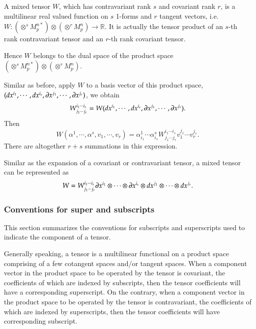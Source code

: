 \documentclass[11pt, a4paper]{book}
\begin{document}
\begin{Definition}
  A mixed tensor $W$, which has contravariant rank $s$ and covariant rank $r$, is a
  multilinear real valued function on $s$ 1-forms and $r$ tangent vectors, i.e.
  $W:\left( \otimes^s M_p^{n*} \right) \otimes \left( \otimes^r M_p^n \right) \rightarrow
  \mathbb{R}$. It is actually the tensor product of an $s$-th rank contravariant tensor and
  an $r$-th rank covariant tensor.
\end{Definition}
Hence $W$ belongs to the dual space of the product space
$\left( \otimes^s M_p^{n*} \right) \otimes \left( \otimes^r M_p^n \right)$.

Similar as before, apply $W$ to a basis vector of this product space,
$(dx^{i_1},\cdots,dx^{i_s},\boldsymbol{\partial}x^{j_1},\cdots,\boldsymbol{\partial}x^{j_r})$, we obtain
\begin{equation}
  W^{i_1\cdots i_s}_{j_1\cdots j_r} = W(dx^{i_1},\cdots,dx^{i_s},\boldsymbol{\partial}x^{j_1},\cdots,\boldsymbol{\partial}x^{j_r}).
\end{equation}
Then
\begin{equation}
  W(\alpha^1,\cdots,\alpha^s,v_1,\cdots,v_r) = \alpha_{i_1}^1\cdots \alpha_{i_s}^s
  W^{i_1\cdots i_s}_{j_1\cdots j_r} v_1^{j_1}\cdots v_r^{j_r}.
\end{equation}
There are altogether $r+s$ summations in this expression.

Similar as the expansion of a covariant or contravariant tensor, a mixed tensor can be
represented as
\begin{equation}
  \label{eq:mixed-tensor-expanded-as-tensor-product}
  W = W^{i_1\cdots i_s}_{j_1\cdots j_r} \boldsymbol{\partial}x^{i_1}\otimes\cdots\otimes
  \boldsymbol{\partial}x^{i_s}\otimes dx^{j_1}\otimes\cdots\otimes dx^{j_r}.
\end{equation}

\subsubsection{Conventions for super and subscripts}

This section summarizes the conventions for subscripts and superscripts used to indicate
the component of a tensor.

Generally speaking, a tensor is a multilinear functional on a product space comprising of
a few cotangent spaces and/or tangent spaces. When a component vector in the product space
to be operated by the tensor is covariant, the coefficients of which are indexed by subscripts, then
the tensor coefficients will have a corresponding superscript. On the contrary, when a
component vector in the product space to be operated by the tensor is contravariant, the
coefficients of which are indexed by superscripts, then the tensor coefficients will have
corresponding subscript.
\end{document}
